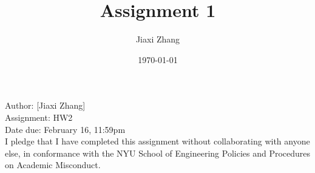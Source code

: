 \documentclass{article}
\title{Assignment 1}
\author{Jiaxi Zhang}
\date{\today}
\begin{document}
\maketitle
\begin{CJK*}{UTF8}{gbsn}
    \begin{flushleft}
    Author: [Jiaxi Zhang]
    \\Assignment: HW2
    \\Date due: February 16, 11:59pm
    \\I pledge that I have completed this assignment without collaborating with anyone else, in conformance with the NYU School of Engineering Policies and Procedures on Academic Misconduct.
    \end{flushleft}

\end{CJK*}
\end{document}
